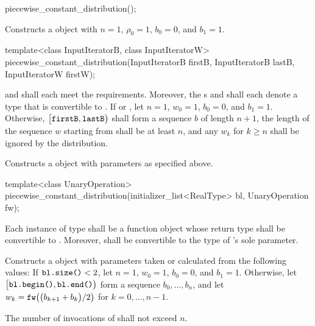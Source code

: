 %
\begin{itemdecl}
piecewise_constant_distribution();
\end{itemdecl}

\begin{itemdescr}
\pnum\effects Constructs a  object
 with $n = 1$,
 $\rho_0 = 1$,
 $b_0 = 0$,
 and $b_1 = 1$.
\end{itemdescr}


%
\begin{itemdecl}
template<class InputIteratorB, class InputIteratorW>
 piecewise_constant_distribution(InputIteratorB firstB, InputIteratorB lastB,
                                 InputIteratorW firstW);
\end{itemdecl}

\begin{itemdescr}
\pnum\requires
   and 
  shall each meet the
   requirements.
  Moreover,
  the s
   and
  shall each denote a type that is convertible to .
 If 
 or ,
 let $n = 1$,
     $w_0 = 1$,
     $b_0 = 0$,
 and $b_1 = 1$.
 Otherwise,
 $\bigl[\texttt{firstB}, \texttt{lastB}\bigr)$
 shall form a sequence $b$ of length $n+1$,
 the length of the sequence $w$ starting from 
 shall be at least $n$,
 and any $w_k$ for  $k \geq n$ shall be ignored by the distribution.

\pnum\effects Constructs a  object
 with parameters as specified above.
\end{itemdescr}


%
\begin{itemdecl}
template<class UnaryOperation>
 piecewise_constant_distribution(initializer_list<RealType> bl, UnaryOperation fw);
\end{itemdecl}

\begin{itemdescr}
\pnum\requires
 Each instance of type 
 shall be a function object
 whose return type shall be convertible to .
 Moreover,
  shall be convertible
 to the type of 's sole parameter.

\pnum\effects Constructs a  object
 with parameters taken or calculated
 from the following values:
 If $\texttt{bl.size()} < 2$,
 let $n = 1$,
     $w_0 = 1$,
     $b_0 = 0$,
 and $b_1 = 1$.
 Otherwise,
 let $\bigl[\texttt{bl.begin()}, \texttt{bl.end()}\bigr)$
 form a sequence $b_0, \dotsc, b_n$,
 and
 let $w_k = \texttt{fw}\bigl(\bigl(b_{k+1} + b_k\bigr) / 2\bigr)$
 for $k = 0, \dotsc, n - 1$.

\pnum\complexity
 The number of invocations of  shall not exceed $n$.
\end{itemdescr}


